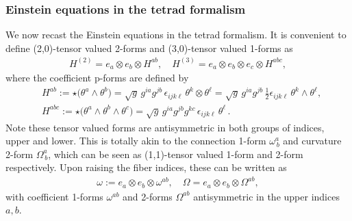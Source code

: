 \subsubsection{Einstein equations in the tetrad formalism}
%
We now recast the Einstein equations in the tetrad formalism.
It is convenient to define (2,0)-tensor valued 2-forms and (3,0)-tensor valued 1-forms as
\begin{align}
    H^{(2)}= e_a\otimes e_b \otimes H^{ab},\quad H^{(3)} = e_a\otimes  e_b \otimes e_c \otimes H^{abc},
\end{align}
where the coefficient p-forms are defined by
\begin{align}
    &H^{ab} := \star\Big(\theta^a \wedge \theta^b\Big) = \sqrt{g}\, g^{ia} g^{jb}\, \epsilon_{ijk\ell}\, \theta^k \otimes \theta^\ell = \sqrt{g}\, g^{ia} g^{jb}\, \tfrac12 \epsilon_{ijk\ell}\, \theta^k \wedge \theta^\ell,\\[3pt]
    &H^{abc} := \star\Big(\theta^a \wedge \theta^b \wedge \theta^c\Big) = \sqrt{g}\, g^{ia} g^{jb} g^{kc}\, \epsilon_{ijk\ell}\,\theta^\ell\,.
\end{align}
Note these tensor valued forms are antisymmetric in both groups of indices, upper and lower.
This is totally akin to the connection 1-form $\omega^a_{\, b}$ and curvature 2-form $\Omega^a_{\, b}$, which can be seen as (1,1)-tensor valued 1-form and 2-form respectively.
Upon raising the fiber indices, these can be written as
\begin{align}
    \omega:= e_a \otimes e_b \otimes \omega^{ab},\quad \Omega = e_a \otimes e_b \otimes \Omega^{ab},
\end{align}
with coefficient 1-forms $\omega^{ab}$ and 2-forms $\Omega^{ab}$ antisymmetric in the upper indices $a,b$.


